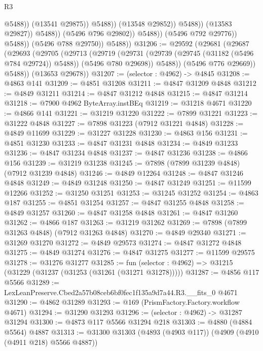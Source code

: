 \begin{lexlean}{R3}
\begin{coremodule}
                                            @5488))
                                        (@13541 @29875))
                                      @5488))
                                  (@13548 @29852))
                                @5488))
                            (@13583 @29827))
                          @5488))
                      (@5496 @796 @29802))
                    @5488))
                (@5496 @792 @29776))
              @5488))
          (@5496 @788 @29750))
        @5488))
@31206 := @29592
    (@29681
      (@29687
        (@29693
          (@29705
            (@29713
              (@29719
                (@29731 (@29739 (@29745 (@31182 (@5496 @784 @29724)) @5488)) (@5496 @780 @29698))
                @5488))
            (@5496 @776 @29669))
          @5488))
      (@13653 @29678))
@31207 := (selector : @4962) -> @4845
@31208 := @4863 @141
@31209 := @4851 @31208
@31211 := @4847 @31209 @4848
@31212 := @4849 @31211
@31214 := @4847 @31212 @4848
@31215 := @4847 @31214
@31218 := @7900 @4962 ByteArray.instBEq
@31219 := @31218 @4671
@31220 := @4866 @141
@31221 := @31219 @31220
@31222 := @7899 @31221
@31223 := @31222 @4848
@31227 := @7898 @31223 (@7912 @31221 @4848)
@31228 := @4849 @11699
@31229 := @31227 @31228
@31230 := @4863 @156
@31231 := @4851 @31230
@31233 := @4847 @31231 @4848
@31234 := @4849 @31233
@31236 := @4847 @31234 @4848
@31237 := @4847 @31236
@31238 := @4866 @156
@31239 := @31219 @31238
@31245 := @7898 (@7899 @31239 @4848) (@7912 @31239 @4848)
@31246 := @4849 @12264
@31248 := @4847 @31246 @4848
@31249 := @4849 @31248
@31250 := @4847 @31249
@31251 := @11599 @12266
@31252 := @31250 @31251
@31253 := @31245 @31252
@31254 := @4863 @187
@31255 := @4851 @31254
@31257 := @4847 @31255 @4848
@31258 := @4849 @31257
@31260 := @4847 @31258 @4848
@31261 := @4847 @31260
@31262 := @4866 @187
@31263 := @31219 @31262
@31269 := @7898 (@7899 @31263 @4848) (@7912 @31263 @4848)
@31270 := @4849 @29340
@31271 := @31269 @31270
@31272 := @4849 @29573
@31274 := @4847 @31272 @4848
@31275 := @4849 @31274
@31276 := @4847 @31275
@31277 := @11599 @29575
@31278 := @31276 @31277
@31285 := fun (selector : @4962) => @31215 (@31229 (@31237 (@31253 (@31261 (@31271 @31278)))))
@31287 := @4856 @117 @5566
@31289 := LexLeanPreserve.Cbed2a57b08ceb6bf0fec1f135a9d7a44.R3.__fits_0 @4671
@31290 := @4862 @31289
@31293 := @169 (PrismFactory.Factory.workflow @4671)
@31294 := @31290 @31293
@31296 := (selector : @4962) -> @31287 @31294
@31300 := @4873 @117 @5566 @31294 @218
@31303 := @4880 (@4884 @5564) @4887
@31313 := @31300 @31303 (@4893 (@4903 @117)) (@4909 (@4910 (@4911 @218) @5566 @4887))

\end{coremodule}
\end{lexlean}
